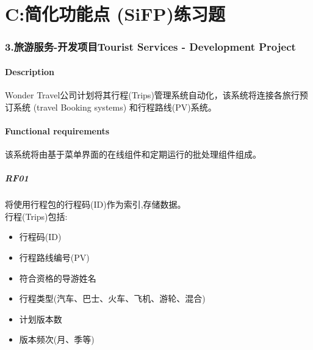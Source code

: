 \chapter{C:简化功能点 (SiFP)练习题} %

\hypertarget{ux65c5ux6e38ux670dux52a1-ux5f00ux53d1ux9879ux76eetourist-services---development-project}{%
\subsection{3.旅游服务-开发项目Tourist Services - Development
Project}\label{ux65c5ux6e38ux670dux52a1-ux5f00ux53d1ux9879ux76eetourist-services---development-project}}

\hypertarget{description}{%
\subsubsection{Description}\label{description}}

Wonder
Travel公司计划将其行程(Trips)管理系统自动化，该系统将连接各旅行预订系统
(travel Booking systems) 和行程路线(PV)系统。\\

\hypertarget{functional-requirements}{%
\subsubsection{Functional requirements}\label{functional-requirements}}

该系统将由基于菜单界面的在线组件和定期运行的批处理组件组成。\\

\hypertarget{rf01}{%
\paragraph{RF01}\label{rf01}}

将使用行程包的行程码(ID)作为索引,存储数据。\\
行程(Trips)包括:

\begin{itemize}
\tightlist
\item
  行程码(ID)
\item
  行程路线编号(PV)
\item
  符合资格的导游姓名
\item
  行程类型(汽车、巴士、火车、飞机、游轮、混合)
\item
  计划版本数
\item
  版本频次(月、季等)\\
\end{itemize}

